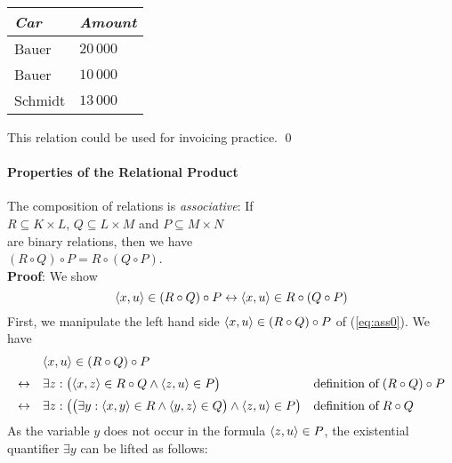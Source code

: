 \begin{center}
  \begin{tabular}[t]{|l|l|}
\hline
\textsl{Car} & \textsl{Amount} \\
\hline
\hline
  Bauer   & $20\,000$ \\
\hline
  Bauer   & $10\,000$ \\
\hline
  Schmidt & $13\,000$ \\
\hline
  \end{tabular} 
\end{center}
This relation could be used for invoicing practice. \qed
\vspace{0.2cm}


\paragraph{Properties of  the Relational Product}
The composition of relations is \emph{associative}:  If \\[0.2cm]
\hspace*{1.3cm} $R \subseteq K \times L$, \quad $Q \subseteq L \times M$ \quad and \quad 
                $P \subseteq M \times N$ \\[0.2cm]
are binary relations, then we have \\[0.2cm]
\hspace*{1.3cm} $(R \circ Q) \circ P = R \circ (Q \circ P)$. \\[0.2cm]
\textbf{Proof}:  We show
\begin{equation}
  \label{eq:ass0}
   \pair(x,u) \in (R \circ Q) \circ P \leftrightarrow \pair(x,u) \in R \circ (Q \circ P)   
\end{equation}
First, we manipulate the left hand side  $\pair(x,u) \in (R \circ Q) \circ P$ of
(\ref{eq:ass0}). We have
\[
\begin{array}{cll}
                  & \pair(x,u) \in (R \circ Q) \circ P \\[0.2cm]
  \leftrightarrow & \exists z: \bigl(\pair(x,z) \in R \circ Q \wedge \pair(z,u) \in P\bigr) &
                    \mbox{definition of}\; (R \circ Q) \circ P \\[0.2cm]
  \leftrightarrow & \exists z: \bigl(\bigl(\exists y: \pair(x,y) \in R \wedge \pair(y,z) \in Q\bigr) \wedge \pair(z,u) \in P\bigr) &
                    \mbox{definition of}\; R \circ Q \\
\end{array}
\]
As the variable $y$ does not occur in the formula $\pair(z,u) \in P$, the existential
quantifier  $\exists y$ can be lifted as follows:
